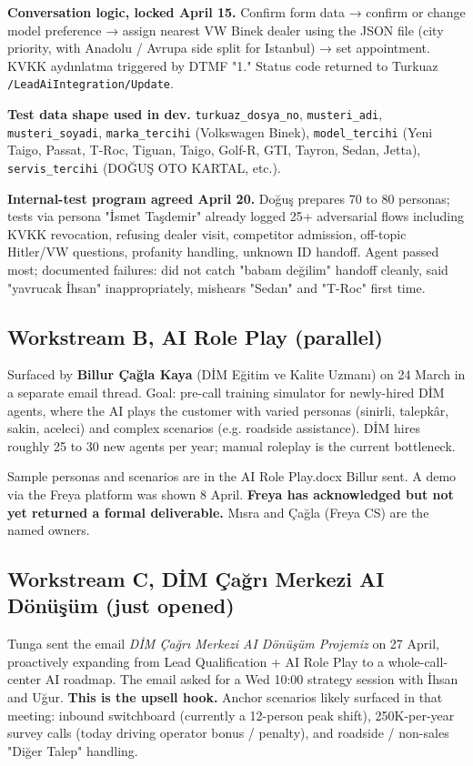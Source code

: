 \documentclass[10pt,a4paper]{article}
\begin{document}
\textbf{Conversation logic, locked April 15.} Confirm form data → confirm or change model preference → assign nearest VW Binek dealer using the JSON file (city priority, with Anadolu / Avrupa side split for Istanbul) → set appointment. KVKK aydınlatma triggered by DTMF "1." Status code returned to Turkuaz \texttt{/LeadAiIntegration/Update}.

\textbf{Test data shape used in dev.} \texttt{turkuaz\_dosya\_no}, \texttt{musteri\_adi}, \texttt{musteri\_soyadi}, \texttt{marka\_tercihi} (Volkswagen Binek), \texttt{model\_tercihi} (Yeni Taigo, Passat, T-Roc, Tiguan, Taigo, Golf-R, GTI, Tayron, Sedan, Jetta), \texttt{servis\_tercihi} (DOĞUŞ OTO KARTAL, etc.).

\textbf{Internal-test program agreed April 20.} Doğuş prepares 70 to 80 personas; tests via persona "İsmet Taşdemir" already logged 25+ adversarial flows including KVKK revocation, refusing dealer visit, competitor admission, off-topic Hitler/VW questions, profanity handling, unknown ID handoff. Agent passed most; documented failures: did not catch "babam değilim" handoff cleanly, said "yavrucak İhsan" inappropriately, mishears "Sedan" and "T-Roc" first time.

\subsection{Workstream B, AI Role Play (parallel)}

Surfaced by \textbf{Billur Çağla Kaya} (DİM Eğitim ve Kalite Uzmanı) on 24 March in a separate email thread. Goal: pre-call training simulator for newly-hired DİM agents, where the AI plays the customer with varied personas (sinirli, talepkâr, sakin, aceleci) and complex scenarios (e.g. roadside assistance). DİM hires roughly 25 to 30 new agents per year; manual roleplay is the current bottleneck.

Sample personas and scenarios are in the AI Role Play.docx Billur sent. A demo via the Freya platform was shown 8 April. \textbf{Freya has acknowledged but not yet returned a formal deliverable.} Mısra and Çağla (Freya CS) are the named owners.

\subsection{Workstream C, DİM Çağrı Merkezi AI Dönüşüm (just opened)}

Tunga sent the email \emph{DİM Çağrı Merkezi AI Dönüşüm Projemiz} on 27 April, proactively expanding from Lead Qualification + AI Role Play to a whole-call-center AI roadmap. The email asked for a Wed 10:00 strategy session with İhsan and Uğur. \textbf{This is the upsell hook.} Anchor scenarios likely surfaced in that meeting: inbound switchboard (currently a 12-person peak shift), 250K-per-year survey calls (today driving operator bonus / penalty), and roadside / non-sales "Diğer Talep" handling.
\end{document}
